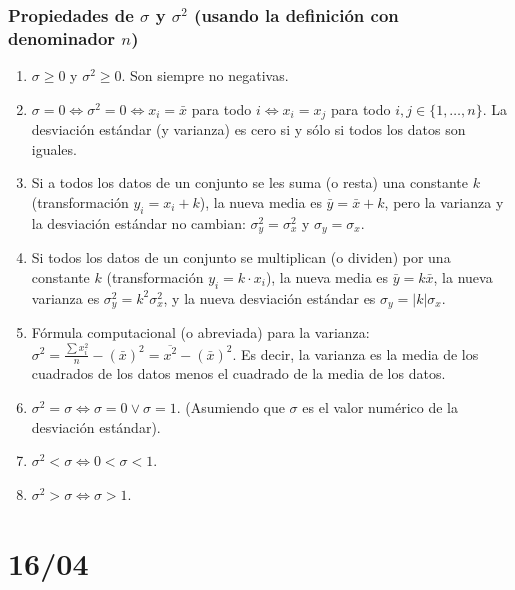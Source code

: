 \documentclass[12pt, letterpaper]{article}
\begin{document}
\subsubsection{Propiedades de $\sigma$ y $\sigma^2$ (usando la definición con denominador $n$)}
\begin{center}
    \begin{enumerate}
        \item $\sigma \ge 0$ y $\sigma^2 \ge 0$. Son siempre no negativas.
        \item $\sigma = 0 \iff \sigma^2 = 0 \iff x_i = \bar{x}$ para todo $i \iff x_i = x_j$ para todo $i, j \in \{1, \dots, n\}$. La desviación estándar (y varianza) es cero si y sólo si todos los datos son iguales.
        \item Si a todos los datos de un conjunto se les suma (o resta) una constante $k$ (transformación $y_i = x_i + k$), la nueva media es $\bar{y} = \bar{x} + k$, pero la varianza y la desviación estándar no cambian: $\sigma_y^2 = \sigma_x^2$ y $\sigma_y = \sigma_x$.
        \item Si todos los datos de un conjunto se multiplican (o dividen) por una constante $k$ (transformación $y_i = k \cdot x_i$), la nueva media es $\bar{y} = k\bar{x}$, la nueva varianza es $\sigma_y^2 = k^2 \sigma_x^2$, y la nueva desviación estándar es $\sigma_y = |k| \sigma_x$.
        \item Fórmula computacional (o abreviada) para la varianza: $\sigma^2 = \frac{\sum x_i^2}{n} - (\bar{x})^2 = \overline{x^2} - (\bar{x})^2$. Es decir, la varianza es la media de los cuadrados de los datos menos el cuadrado de la media de los datos.
        \item $\sigma^2=\sigma \iff \sigma=0 \vee \sigma=1$. (Asumiendo que $\sigma$ es el valor numérico de la desviación estándar).
        \item $\sigma^2 < \sigma \iff 0 < \sigma < 1$.
        \item $\sigma^2 > \sigma \iff \sigma > 1$.
    \end{enumerate}
\end{center}
\newpage

\section{16/04}
\end{document}
